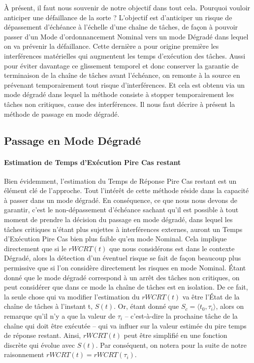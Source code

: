 \documentclass[french, a4paper, 11pt, twoside, pdftex]{StyleThese}
\begin{document}
	À présent, il faut nous souvenir de notre objectif dans tout cela. Pourquoi vouloir anticiper une défaillance de la sorte ? L'objectif est d'anticiper un risque de dépassement d'échéance à l'échelle d'une chaîne de tâches, de façon à pouvoir passer d'un Mode d'ordonnancement Nominal vers un mode Dégradé dans lequel on va prévenir la défaillance. Cette dernière a pour origine première les interférences matérielles qui augmentent les temps d'exécution des tâches. Aussi pour éviter davantage ce glissement temporel et donc conserver la garantie de terminaison de la chaîne de tâches avant l'échéance, on remonte à la source en prévenant temporairement tout risque d'interférences. Et cela est obtenu via un mode dégradé dans lequel la méthode consiste à stopper temporairement les tâches non critiques, cause des interférences.
	Il nous faut décrire à présent la méthode de passage en mode dégradé.
	

    
    \subsection{Passage en Mode Dégradé}
    
        \paragraph{Estimation de Temps d'Exécution Pire Cas restant}
    Bien évidemment, l'estimation du Temps de Réponse Pire Cas restant est un élément clé de l'approche. Tout l'intérêt de cette méthode réside dans la capacité à passer dans un mode dégradé. En conséquence, ce que nous nous devons de garantir, c'est le non-dépassement d'échéance sachant qu'il est possible à tout moment de prendre la décision du passage en mode dégradé, dans lequel les tâches critiques n'étant plus sujettes à interférences externes, auront un Temps d'Exécution Pire Cas bien plus faible qu'en mode Nominal. 
    Cela implique directement que si le $rWCRT(t)$ que nous considérons est dans le contexte Dégradé, alors la détection d'un éventuel risque se fait de façon beaucoup plus permissive que si l'on considère directement les risques en mode Nominal. 
    Étant donné que le mode dégradé correspond à un arrêt des tâches non critiques, on peut considérer que dans ce mode la chaîne de tâches est en isolation. De ce fait, la seule chose qui va modifier l'estimation du $rWCRT(t)$ va être l'État de la chaîne de tâches à l'instant t, $S(t)$. Or, étant donné que $S_c = \langle t_0, \tau_i\rangle$, alors on remarque qu'il n'y a que la valeur de $\tau_i$ -- c'est-à-dire la prochaine tâche de la chaîne qui doit être exécutée -- qui va influer sur la valeur estimée du pire temps de réponse restant. Ainsi, $rWCRT(t)$ peut être simplifié en une fonction discrète qui évolue avec $S(t)$. Par conséquent, on notera pour la suite de notre raisonnement $rWCRT(t) = rWCRT(\tau_i)$. 
    
\end{document}
